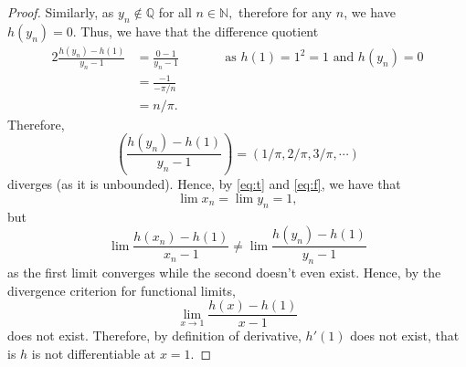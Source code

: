 \documentclass[10pt]{article}
\begin{document}
\begin{proof}
    Similarly, as $y_n\notin\mathbb{Q}$ for all $n\in\mathbb{N},$ therefore for any $n$, we have $h(y_n)=0.$ Thus, we have that the difference quotient
    \begin{alignat*}{2}
        \frac{h(y_n)-h(1)}{y_n-1} &= \frac{0-1}{y_n-1} &&\qquad\text{as }h(1)=1^2=1\text{ and } h(y_n)=0\\
        &= \frac{-1}{-\pi/n}\\
        &=n/\pi.
    \end{alignat*}
    Therefore,
    \begin{equation} \label{eq:f}
        \left (\frac{h(y_n)-h(1)}{y_n-1} \right ) = (1/\pi,2/\pi,3/\pi,\cdots)
    \end{equation}
    diverges (as it is unbounded).
    Hence, by \eqref{eq:t} and \eqref{eq:f}, we have that
    \begin{equation*}
        \lim x_n = \lim y_n = 1,
    \end{equation*}
    but
    \begin{equation*}
        \lim \frac{h(x_n)-h(1)}{x_n-1} \neq \lim \frac{h(y_n)-h(1)}{y_n-1}
    \end{equation*}
    as the first limit converges while the second doesn't even exist.
    Hence, by the divergence criterion for functional limits,
    \begin{equation*}
        \lim_{x\to 1} \frac{h(x)-h(1)}{x-1}
    \end{equation*}
     does not exist. Therefore, by definition of derivative, $h'(1)$ does not exist, that is $h$ is not differentiable at $x=1$.
\end{proof}
\end{document}
